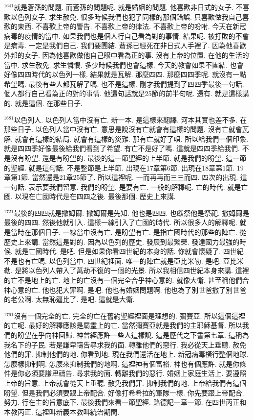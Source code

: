 \documentclass{book}
\begin{document}
$^{1641}$就是蒼孫的問題.
而蒼孫的問題呢.
就是婚姻的問題.
他喜歡非日式的女子.
不喜歡以色列女子.
求生赦免.
很多時候我們也犯了同樣的那個錯誤.
只喜歡做我自己喜歡的東西.
不喜歡上帝的警告.
不喜歡上帝的律法.
不喜歡上帝的吩咐.
今天在新冠病毒的疫情的當中.
如果我們也是個人行自己看為對的事情.
結果呢.
被打敗的不會是病毒.
一定是我們自己.
我們要團結.
蒼孫已經死在非日式人手裡了.
因為他喜歡外邦的女子.
因為他喜歡做他自己眼中看為正的事.
沒有上帝的位置.
在他的生活的當中.
求生赦免.
求生憐憫.
多少時候我們也會這樣.
今天的教會如果不團結.
也會好像四四時代的以色列一樣.
結果就是瓦解.
那麼四四.
那麼四四季呢.
就沒有一點希望嗎.
最後有些人都瓦解了嗎.
也不是這樣.
剛才我們提到了四四季最後一句話.
個人都行自己看為正的對的事情.
他這句話就是25節的前半句呢.
還有.
就是這樣講的.
就是這個.
在那些日子.

$^{1681}$以色列人.
以色列人當中沒有亡.
新一本.
是這樣來翻譯.
河本其實也差不多.
在那些日子.
以色列人當中沒有亡.
意思是說沒有亡就會有這樣的問題.
沒有亡就會瓦解.
就會有這樣的結局.
就會有這樣的災難.
那有亡就好了唄.
所以給我們一個印象.
就是四四季好像最後給我們看到了希望.
有亡不是好了嗎.
這就是四四季給我們.
不是沒有盼望.
還是有盼望的.
最後的這一節聖經的上半節.
就是我們的盼望.
這一節的聖經.
就是這句話.
不是整節是上半節.
出現在17章第6節.
出現在18章第1節.
19章第1節.
當然還是21章25節了.
所以這裡呢.
一而再再而三三而四.
四次的出現.
這一句話.
表示要我們留意.
我們的盼望.
是要有亡.
一般的解釋呢.
亡的時代.
就是亡國.
以現在亡國時代是在四四之後.
最後那個.
歷史上來講.

$^{1721}$最後的四四就是撒姆爾.
撒姆爾是先知.
他也是四四.
也獻祭他是祭祀.
撒姆爾是最後的四四.
然後他就引入.
這樣一線引入了亡國的時代.
所以很多人的解釋呢.
就是當時在那個日子.
一線當中沒有亡.
是盼望有亡.
是指亡國時代的那些的陣亡.
從歷史上來講.
當然這是對的.
因為以色列的歷史.
發展到最繁榮.
發達國力最強的時候.
就是亡國時代.
是吧.
但是如果你看四世紀的本身的話.
你就會懷疑了.
四世紀不是也有亡嗎.
以色列當中.
四世紀裡面.
唯一的陣亡就是亞比米勒.
是吧.
亞比米勒.
是將以色列人帶入了萬劫不復的一個的光景.
所以我相信四世紀本身來講.
這裡的亡不是地上的亡.
地上的亡沒有一個完全合乎神心意的.
就像大衛.
甚至稱他們合神心意的亡.
他也犯大罪啊.
是吧.
他也有婚姻問題啊.
他也為了別世爸撒了別世爸的老公啊.
太無恥逼比了.
是吧.
這就是大衛.

$^{1761}$沒有一個完全的亡.
完全的亡在舊約聖經裡面是理想的.
彌賽亞.
所以這個這裡的亡呢.
最好的解釋應該是屬靈上的亡.
當然彌賽亞就是我們的主耶穌基督.
所以我們的盼望在乎向神回歸.
神曾經應許一些人這樣說.
這是歷代之下書第七章.
這稱為我名下的子民.
若是謙卑禱告尋求我的面.
轉離他們的惡行.
我必從天上垂聽.
赦免他們的罪.
抑制他們的地.
你看到地.
現在我們還活在地上.
新冠病毒橫行整個地球.
怎麼樣抑制啊.
怎麼來抑制我們的地啊.
這裡神有個富裕.
神也有個應許.
就是你條件是你必須要謙卑禱告.
尋求我的面.
轉離我們的惡行.
婚姻上家庭生活上.
要遵照上帝的旨意.
上帝就會從天上垂聽.
赦免我們罪.
抑制我們的地.
上帝給我們有這個盼望.
但是我們必須要跟上帝配合.
好像打希希拉的軍隊一樣.
你先要跟上帝配合.
努力.
行在主的旨意底下.
最後我們來看一節聖經.
路德記一章一節.
在四世丙正和本教丙正.
這裡叫新義本教叫統治期間.
\end{document}
